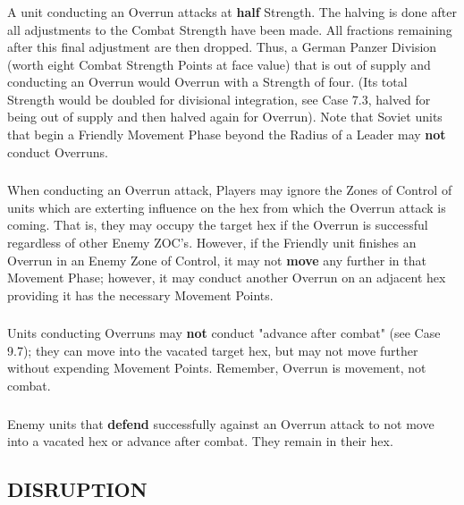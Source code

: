 \subsubsection{} A unit conducting an Overrun attacks at \textbf{half} Strength. The halving is done after all adjustments to the Combat Strength have been made. All fractions remaining after this final adjustment are then dropped. Thus, a German Panzer Division (worth eight Combat Strength Points at face value) that is out of supply and conducting an Overrun would Overrun with a Strength of four. (Its total Strength would be doubled for divisional integration, see Case 7.3, halved for being out of supply and then halved again for Overrun). Note that Soviet units that begin a Friendly Movement Phase beyond the Radius of a Leader may \textbf{not} conduct Overruns.

\subsubsection{} When conducting an Overrun attack, Players may ignore the Zones of Control of units which are exterting influence on the hex from which the Overrun attack is coming. That is, they may occupy the target hex if the Overrun is successful regardless of other Enemy ZOC's. However, if the Friendly unit finishes an Overrun in an Enemy Zone of Control, it may not \textbf{move} any further in that Movement Phase; however, it may conduct another Overrun on an adjacent hex providing it has the necessary Movement Points.

\subsubsection{} Units conducting Overruns may \textbf{not} conduct "advance after combat" (see Case 9.7); they can move into the vacated target hex, but may not move further without expending Movement Points. Remember, Overrun is movement, not combat.

\subsubsection{} Enemy units that \textbf{defend} successfully against an Overrun attack to not move into a vacated hex or advance after combat. They remain in their hex.

\subsection{DISRUPTION}

